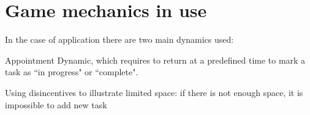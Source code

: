 \section{Game mechanics in use}

In the case of application there are two main dynamics used:

\begin{compactenum}
\item Appointment Dynamic, which requires to return at a predefined time to mark a task as ``in progress" or ``complete".\item Using disincentives to illustrate limited space: if there is not enough space, it is impossible to add new task
\end{compactenum}